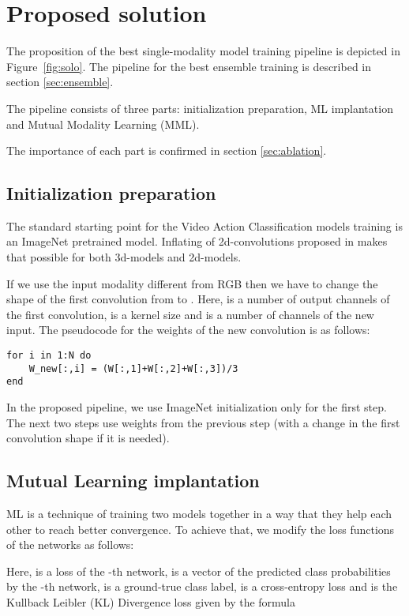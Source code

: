 \documentclass[conference]{IEEEtran}
\begin{document}
\section{Proposed solution}

The proposition of the best single-modality model training pipeline is depicted in Figure~\ref{fig:solo}. The pipeline for the best ensemble training is described in section \ref{sec:ensemble}.

The pipeline consists of three parts: initialization preparation, ML implantation and Mutual Modality Learning (MML).

The importance of each part is confirmed in section \ref{sec:ablation}.

\subsection{Initialization preparation}

The standard starting point for the Video Action Classification models training is an ImageNet \cite{deng2009imagenet} pretrained model. Inflating of 2d-convolutions proposed in \cite{carreira2017quo} makes that possible for both 3d-models and 2d-models.

If we use the input modality different from RGB then we have to change the shape of the first convolution from  to . Here,  is a number of output channels of the first convolution,  is a kernel size and  is a number of channels of the new input. The pseudocode for the weights of the new convolution is as follows:

\begin{verbatim}
for i in 1:N do
    W_new[:,i] = (W[:,1]+W[:,2]+W[:,3])/3
end
\end{verbatim}

In the proposed pipeline, we use ImageNet initialization only for the first step. The next two steps use weights from the previous step (with a change in the first convolution shape if it is needed).

\subsection{Mutual Learning implantation}

ML is a technique of training two models together in a way that they help each other to reach better convergence. To achieve that, we modify the loss functions of the networks as follows:


Here,  is a loss of the -th network,  is a vector of the predicted class probabilities by the -th network,  is a ground-true class label,  is a cross-entropy loss and  is the Kullback Leibler (KL) Divergence loss given by the formula
\end{document}
